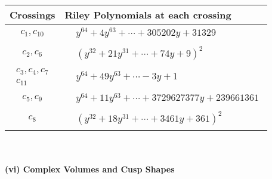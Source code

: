 \documentclass[1p]{elsarticle_modified}
\theoremstyle{definition}
\begin{document}
\begin{tabular}{m{50pt}|m{274pt}}
Crossings & \hspace{64pt}Riley Polynomials at each crossing \\
\hline $$\begin{aligned}c_{1},c_{10}\end{aligned}$$&$\begin{aligned}
&y^{64}+4 y^{63}+\cdots+305202 y+31329
\end{aligned}$\\
\hline $$\begin{aligned}c_{2},c_{6}\end{aligned}$$&$\begin{aligned}
&(y^{32}+21 y^{31}+\cdots+74 y+9)^{2}
\end{aligned}$\\
\hline $$\begin{aligned}c_{3},c_{4},c_{7}\\c_{11}\end{aligned}$$&$\begin{aligned}
&y^{64}+49 y^{63}+\cdots-3 y+1
\end{aligned}$\\
\hline $$\begin{aligned}c_{5},c_{9}\end{aligned}$$&$\begin{aligned}
&y^{64}+11 y^{63}+\cdots+3729627377 y+239661361
\end{aligned}$\\
\hline $$\begin{aligned}c_{8}\end{aligned}$$&$\begin{aligned}
&(y^{32}+18 y^{31}+\cdots+3461 y+361)^{2}
\end{aligned}$\\
\hline
\end{tabular}\\~\\
\newpage\flushleft \textbf{(vi) Complex Volumes and Cusp Shapes}
\end{document}
